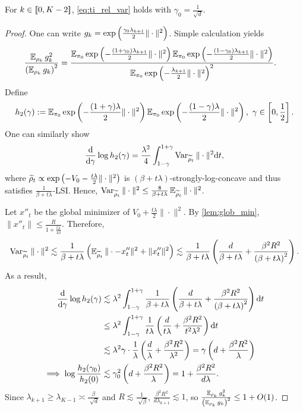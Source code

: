 \begin{lemma}
    For $k\in\left[\!\left[0,K-2\right]\!\right]$, \cref{eq:ti_rel_var} holds with $\gamma_0=\frac{1}{\sqrt{d}}$.
    \label{lem:ti_rel_var_others}
\end{lemma}
\begin{proof}
    One can write $g_k=\exp\left(\frac{\gamma_0\lambda_{k+1}}{2}\|\cdot\|^2\right)$. Simple calculation yields
    \begin{align*}
        \frac{\operatorname{\mathbb{E}}_{\rho_k}g_k^2}{\left(\operatorname{\mathbb{E}}_{\rho_k}g_k\right)^2} & =\frac{\operatorname{\mathbb{E}}_{\pi_0}\exp\left(-\frac{(1+\gamma_0)\lambda_{k+1}}{2}\|\cdot\|^2\right)\operatorname{\mathbb{E}}_{\pi_0}\exp\left(-\frac{(1-\gamma_0)\lambda_{k+1}}{2}\|\cdot\|^2\right)}{{\operatorname{\mathbb{E}}_{\pi_0}\exp\left(-\frac{\lambda_{k+1}}{2}\|\cdot\|^2\right)}^2}.
    \end{align*}
    Define
    $$h_2(\gamma):=\operatorname{\mathbb{E}}_{\pi_0}\exp\left(-\frac{(1+\gamma)\lambda}{2}\|\cdot\|^2\right)\operatorname{\mathbb{E}}_{\pi_0}\exp\left(-\frac{(1-\gamma)\lambda}{2}\|\cdot\|^2\right),~\gamma\in\left[0,\frac{1}{2}\right].$$
    One can similarly show
    $$\frac{\mathrm{d}}{\mathrm{d}\gamma}\log h_2(\gamma)=\frac{\lambda^2}{4}\int_{1-\gamma}^{1+\gamma}\operatorname{Var}_{\widetilde{\rho}_t}\|\cdot\|^2\mathrm{d} t,$$
    where $\widetilde{\rho}_t\propto\exp\left(-V_0-\frac{t\lambda}{2}\|\cdot\|^2\right)$ is $(\beta+t\lambda)$-strongly-log-concave and thus satisfies $\frac{1}{\beta+t\lambda}$-LSI. Hence, $\operatorname{Var}_{\widetilde{\rho}_t}\|\cdot\|^2\le\frac{8}{\beta+t\lambda}\operatorname{\mathbb{E}}_{\widetilde{\rho}_t}\|\cdot\|^2$.

    Let $x''_t$ be the global minimizer of $V_0+\frac{t\lambda}{2}\|\cdot\|^2$. By \cref{lem:glob_min}, $\|x''_t\|\le\frac{R}{1+\frac{t\lambda}{3\beta}}$. Therefore,
    $$\operatorname{Var}_{\widetilde{\rho}_t}\|\cdot\|^2\lesssim\frac{1}{\beta+t\lambda}\left(\operatorname{\mathbb{E}}_{\widetilde{\rho}_t}\|\cdot-x''_t\|^2+\|x''_t\|^2\right)\lesssim\frac{1}{\beta+t\lambda}\left(\frac{d}{\beta+t\lambda}+\frac{\beta^2R^2}{\left(\beta+t\lambda\right)^2}\right).$$
    As a result,
    \begin{align*}
        \frac{\mathrm{d}}{\mathrm{d}\gamma}\log h_2(\gamma)            & \lesssim\lambda^2\int_{1-\gamma}^{1+\gamma}\frac{1}{\beta+t\lambda}\left(\frac{d}{\beta+t\lambda}+\frac{\beta^2R^2}{\left(\beta+t\lambda\right)^2}\right)\mathrm{d} t \\
                                                 & \le\lambda^2\int_{1-\gamma}^{1+\gamma}\frac{1}{t\lambda}\left(\frac{d}{t\lambda}+\frac{\beta^2R^2}{t^2\lambda^2}\right)\mathrm{d} t                           \\
                                                 & \lesssim\lambda^2\gamma\cdot\frac{1}{\lambda}\left(\frac{d}{\lambda}+\frac{\beta^2R^2}{\lambda^2}\right)=\gamma\left(d+\frac{\beta^2R^2}{\lambda}\right)       \\
        \implies\log\frac{h_2(\gamma_0)}{h_2(0)} & \lesssim\gamma_0^2\left(d+\frac{\beta^2R^2}{\lambda}\right)=1+\frac{\beta^2R^2}{d\lambda}.
    \end{align*}
    Since $\lambda_{k+1}\ge\lambda_{K-1}\asymp\frac{\beta}{\sqrt[]{d}}$ and $R\lesssim\frac{1}{\sqrt[]{\beta}}$, $\frac{\beta^2R^2}{d\lambda_{k+1}}\lesssim1$, so $\frac{\operatorname{\mathbb{E}}_{\rho_k}g_k^2}{\left(\operatorname{\mathbb{E}}_{\rho_k}g_k\right)^2}\le1+O(1)$.
\end{proof}


